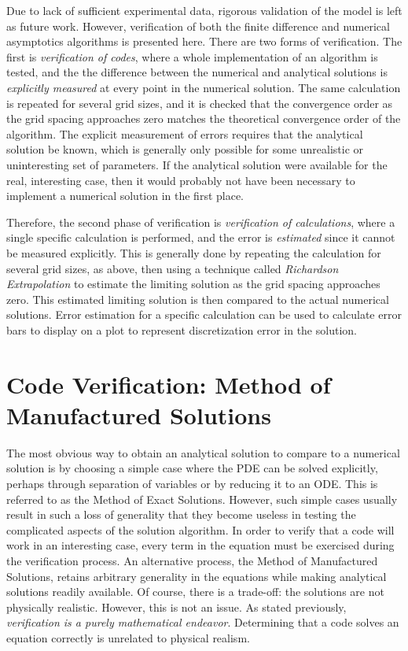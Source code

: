 Due to lack of sufficient experimental data, rigorous validation of the model is left as future work.
However, verification of both the finite difference and numerical asymptotics algorithms is presented here.
There are two forms of verification.
The first is \textit{verification of codes}, where a whole implementation of an algorithm is tested, and the the difference between the numerical and analytical solutions is \textit{explicitly measured} at every point in the numerical solution.
The same calculation is repeated for several grid sizes, and it is checked that the convergence order as the grid spacing approaches zero matches the theoretical convergence order of the algorithm.
The explicit measurement of errors requires that the analytical solution be known, which is generally only possible for some unrealistic or uninteresting set of parameters.
If the analytical solution were available for the real, interesting case, then it would probably not have been necessary to implement a numerical solution in the first place.

Therefore, the second phase of verification is \textit{verification of calculations}, where a single specific calculation is performed, and the error is \textit{estimated} since it cannot be measured explicitly.
This is generally done by repeating the calculation for several grid sizes, as above, then using a technique called \textit{Richardson Extrapolation} to estimate the limiting solution as the grid spacing approaches zero.
This estimated limiting solution is then compared to the actual numerical solutions.
Error estimation for a specific calculation can be used to calculate error bars to display on a plot to represent discretization error in the solution.

\section{Code Verification: Method of Manufactured Solutions}

The most obvious way to obtain an analytical solution to compare to a numerical solution is by choosing a simple case where the PDE can be solved explicitly, perhaps through separation of variables or by reducing it to an ODE.
This is referred to as the Method of Exact Solutions.
However, such simple cases usually result in such a loss of generality that they become useless in testing the complicated aspects of the solution algorithm.
In order to verify that a code will work in an interesting case, every term in the equation must be exercised during the verification process.
An alternative process, the Method of Manufactured Solutions, retains arbitrary generality in the equations while making analytical solutions readily available.
Of course, there is a trade-off: the solutions are not physically realistic.
However, this is not an issue.
As stated previously, \textit{verification is a purely mathematical endeavor}.
Determining that a code solves an equation correctly is unrelated to physical realism.

